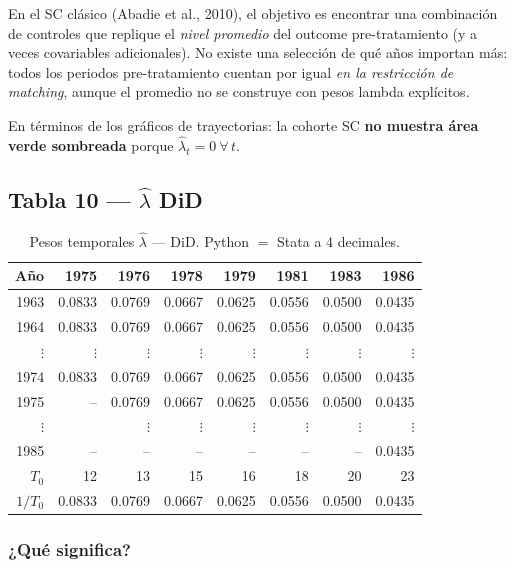 \documentclass[11pt, a4paper]{article}
\begin{document}
\begin{interpretacion}
En el SC clásico (Abadie et al., 2010), el objetivo es encontrar una combinación
de controles que replique el \textit{nivel promedio} del outcome pre-tratamiento
(y a veces covariables adicionales). No existe una selección de qué años importan
más: todos los periodos pre-tratamiento cuentan por igual \textit{en la restricción
de matching}, aunque el promedio no se construye con pesos lambda explícitos.

\medskip
En términos de los gráficos de trayectorias: la cohorte SC
\textbf{no muestra área verde sombreada} porque $\hat{\lambda}_t = 0\ \forall\,t$.
\end{interpretacion}

\subsection{Tabla 10 — $\hat{\lambda}$ DiD}

\begin{table}[H]
\centering
\caption{Pesos temporales $\hat{\lambda}$ --- DiD. Python $=$ Stata a 4 decimales.}
\small
\begin{tabular}{rrrrrrrr}
\toprule
Año & 1975 & 1976 & 1978 & 1979 & 1981 & 1983 & 1986 \\
\midrule
1963 & 0.0833 & 0.0769 & 0.0667 & 0.0625 & 0.0556 & 0.0500 & 0.0435 \\
1964 & 0.0833 & 0.0769 & 0.0667 & 0.0625 & 0.0556 & 0.0500 & 0.0435 \\
$\vdots$ & $\vdots$ & $\vdots$ & $\vdots$ & $\vdots$ & $\vdots$ & $\vdots$ & $\vdots$ \\
1974 & 0.0833 & 0.0769 & 0.0667 & 0.0625 & 0.0556 & 0.0500 & 0.0435 \\
1975 & --     & 0.0769 & 0.0667 & 0.0625 & 0.0556 & 0.0500 & 0.0435 \\
$\vdots$ & & $\vdots$ & $\vdots$ & $\vdots$ & $\vdots$ & $\vdots$ & $\vdots$ \\
1985 & --     & --     & --     & --     & --     & --     & 0.0435 \\
\midrule
$T_0$ & 12 & 13 & 15 & 16 & 18 & 20 & 23 \\
$1/T_0$ & 0.0833 & 0.0769 & 0.0667 & 0.0625 & 0.0556 & 0.0500 & 0.0435 \\
\bottomrule
\end{tabular}
\end{table}

\subsubsection*{¿Qué significa?}
\end{document}
